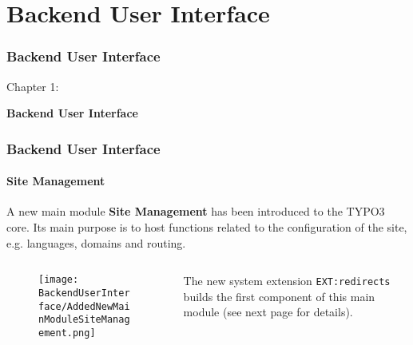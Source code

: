 %

\section{Backend User Interface}
\begin{frame}[fragile]
	\frametitle{Backend User Interface}

	\begin{center}\huge{Chapter 1:}\end{center}
	\begin{center}\huge{\color{typo3darkgrey}\textbf{Backend User Interface}}\end{center}

\end{frame}


\begin{frame}[fragile]
	\frametitle{Backend User Interface}
	\framesubtitle{Site Management}

	A new main module \textbf{Site Management} has been introduced to the TYPO3 core.
	Its main purpose is to host functions related to the configuration of the site,
	e.g. languages, domains and routing.

	\begin{columns}[T]
		\begin{column}{.4\textwidth}
			\begin{figure}\vspace*{-0.4cm}
				\texttt{[image: BackendUserInterface/AddedNewMainModuleSiteManagement.png]}
			\end{figure}
		\end{column}
		\begin{column}{.5\textwidth}
			The new system extension \texttt{EXT:redirects} builds the first component
			of this main module (see next page for details).
		\end{column}
		\begin{column}{.1\textwidth}
		\end{column}
	\end{columns}

\end{frame}

